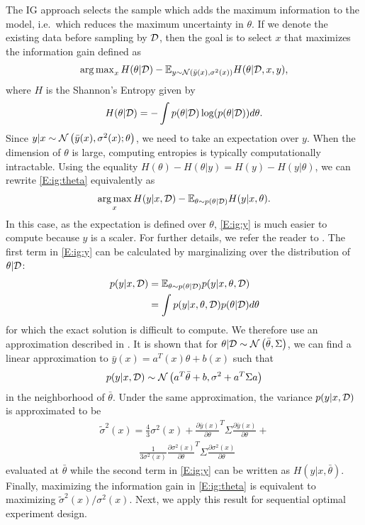 The IG approach selects the sample which adds the maximum information to the model, i.e.~which reduces the maximum uncertainty in \(\theta\). If we denote the existing data before sampling by \(\mathcal{D}\), then the goal is to select \(x\) that maximizes the information gain defined as
\begin{align}
\textstyle\operatorname*{arg\,max}_x H(\theta|\mathcal{D}) - \mathbb{E}_{y \sim \operatorname*{\mathcal{N}}\left(\bar{y}(x), \sigma^2(x)\right)}H(\theta|\mathcal{D},x,y),
\label{E:ig:theta}
\end{align}
where \(H\) is the Shannon's Entropy given by
\begin{align}
H(\theta|\mathcal{D}) = -\int p(\theta|\mathcal{D}) \log (p(\theta|\mathcal{D}))d\theta.
\end{align}
Since \(y|x \sim \operatorname*{\mathcal{N}}\left(\bar{y}(x), \sigma^2(x);\theta\right)\), we need to take an expectation over \(y\).
When the dimension of \(\theta\) is large, computing entropies is typically computationally intractable.
Using the equality \(H(\theta) - H(\theta|y) = H(y) - H(y|\theta)\), we can rewrite \eqref{E:ig:theta} equivalently as
\begin{align}
\operatorname*{arg\,max}_x H(y|x,\mathcal{D}) - \mathbb{E}_{\theta \sim p(\theta|\mathcal{D})}H(y|x,\theta).
\label{E:ig:y}
\end{align}
In this case, as the expectation is defined over \(\theta\), \eqref{E:ig:y} is much easier to compute because \(y\) is a scaler.
For further details, we refer the reader to \cite{Houlsby2011}.
The first term in \eqref{E:ig:y} can be calculated by marginalizing over the distribution of \(\theta|\mathcal{D}\):
\begin{align}
p(y|x,\mathcal{D}) &= \mathbb{E}_{\theta \sim p(\theta|\mathcal{D})}p(y|x,\theta,\mathcal{D}) \nonumber\\
&= \int p(y|x,\theta, \mathcal{D})p(\theta|\mathcal{D})d\theta
\end{align}
for which the exact solution is difficult to compute. We therefore use an approximation described in \cite{Garnett2013}. It is shown that for \(\theta|\mathcal{D} \sim \operatorname*{\mathcal{N}}\left(\bar{\theta}, \Sigma\right)\), we can find a linear approximation to \(\bar{y}(x) = a^T(x)\theta+b(x)\) such that
\begin{align}
p(y|x,\mathcal{D}) \sim \operatorname*{\mathcal{N}}\left(a^T\bar{\theta}+b, \sigma^2+a^T\Sigma a\right)
\end{align}
in the neighborhood of \(\bar{\theta}\).
Under the same approximation, the variance \(p(y|x,\mathcal{D})\) is approximated to be
\begin{align}
\tilde{\sigma}^2(x) = \frac{4}{3}\sigma^2(x) + \frac{\partial \bar{y}(x)}{\partial \theta}^T \Sigma \frac{\partial \bar{y}(x)}{\partial \theta} + \nonumber \\
\qquad\qquad \frac{1}{3\sigma^2(x)}\frac{\partial \sigma^2(x)}{\partial \theta}^T \Sigma \frac{\partial \sigma^2(x)}{\partial \theta}
\end{align}
evaluated at \(\bar{\theta}\) while the second term in \eqref{E:ig:y} can be written as \(H(y|x,\bar{\theta})\). 
Finally, maximizing the information gain in \eqref{E:ig:theta} is equivalent to maximizing \(\tilde{\sigma}^2(x)/{\sigma}^2(x)\).
Next, we apply this result for sequential optimal experiment design.

